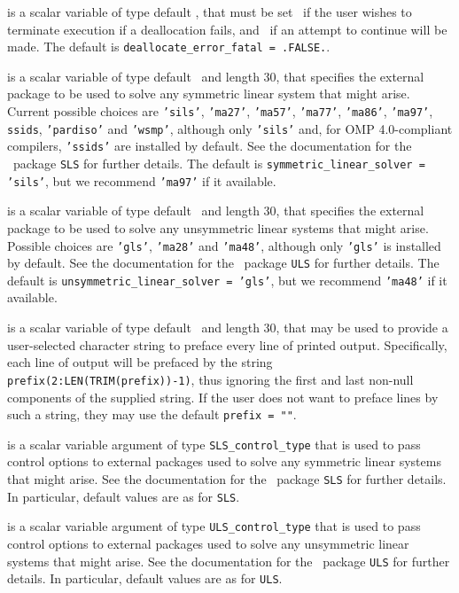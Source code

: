 \documentclass{galahad}
\begin{document}
\begin{description}
 is a scalar variable of type default \logical,
that must be set \true\ if the user wishes to terminate execution if
a deallocation  fails, and \false\ if an attempt to continue
will be made. The default is {\tt deallocate\_error\_fatal = .FALSE.}.

 is a scalar variable of type default \character\
and length 30, that specifies the external package to be used to
solve any symmetric linear system that might arise. Current possible
choices are {\tt 'sils'}, {\tt 'ma27'}, {\tt 'ma57'}, {\tt 'ma77'},
{\tt 'ma86'}, {\tt 'ma97'}, {\tt ssids}, {\tt 'pardiso'}
and {\tt 'wsmp'},
although only {\tt 'sils'} and, for OMP 4.0-compliant compilers,
{\tt 'ssids'} are installed by default.
See the documentation for the \galahad\ package {\tt SLS} for further details.
The default is {\tt symmetric\_linear\_solver = 'sils'},
but we recommend {\tt 'ma97'} if it available.

 is a scalar variable of type default
\character\
and length 30, that specifies the external package to be used to
solve any unsymmetric linear systems that might arise. Possible
choices are
{\tt 'gls'},
{\tt 'ma28'}
and
{\tt 'ma48'},
although only {\tt 'gls'} is installed by default.
See the documentation for the \galahad\ package {\tt ULS} for further details.
The default is {\tt unsymmetric\_linear\_solver = 'gls'},
but we recommend {\tt 'ma48'} if it available.

 is a scalar variable of type default \character\
and length 30, that may be used to provide a user-selected
character string to preface every line of printed output.
Specifically, each line of output will be prefaced by the string
{\tt prefix(2:LEN(TRIM(prefix))-1)},
thus ignoring the first and last non-null components of the
supplied string. If the user does not want to preface lines by such
a string, they may use the default {\tt prefix = ""}.

\itt{SLS\_control} is a scalar variable argument of type
{\tt SLS\_control\_type} that is used to pass control
options to external packages used to solve any symmetric
linear systems that might arise.
See the documentation for the \galahad\ package {\tt SLS} for further details.
In particular, default values are as for {\tt SLS}.

\itt{ULS\_control} is a scalar variable argument of type
{\tt ULS\_control\_type} that is used to pass control
options to external packages used to solve any unsymmetric
linear systems that might arise.
See the documentation for the \galahad\ package {\tt ULS} for further details.
In particular, default values are as for {\tt ULS}.

\end{description}
\end{document}
